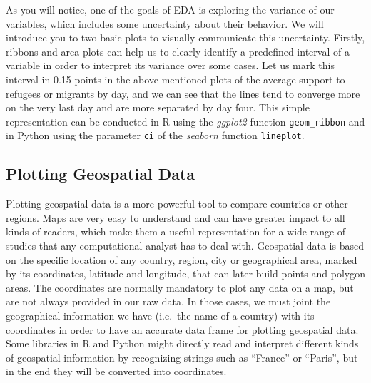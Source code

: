 As you will notice, one of the goals of EDA is exploring the variance of our variables, which includes some uncertainty about their behavior. We will introduce you to two basic plots to visually communicate this uncertainty. Firstly, ribbons and area plots can help us to clearly identify a predefined interval of a variable in order to interpret its variance over some cases. Let us mark this interval in 0.15 points in the above-mentioned plots of the average support to refugees or migrants by day, and we can see that the lines tend to converge more on the very last day and are more separated by  day four. This simple representation can be conducted in R using the \emph{ggplot2} function \texttt{geom\_ribbon} and in Python using the parameter \texttt{ci} of the \emph{seaborn} function \texttt{lineplot}.





\subsection{Plotting Geospatial Data}

Plotting geospatial data is a more powerful tool to compare countries or other regions.  Maps are very easy to understand and can have greater impact to all kinds of readers, which make them a useful representation for a wide range of studies that any computational analyst has to deal with. Geospatial data is based on the specific location of any country, region, city or geographical area, marked by its coordinates, latitude and longitude, that can later build points and polygon areas. The coordinates are normally mandatory to plot any data on a map, but are not always provided in our raw data. In those cases, we must joint the geographical information we have (i.e.\ the name of a country) with its coordinates in order to have an accurate data frame for plotting geospatial data. Some libraries in R and Python might directly read and interpret different kinds of geospatial information by recognizing strings such as ``France'' or ``Paris'', but in the end they will be converted into coordinates.

